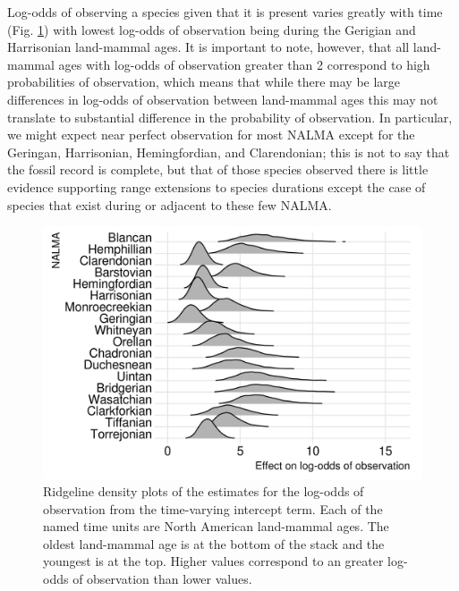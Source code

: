 \documentclass[12pt,letterpaper]{article}
\begin{document}
Log-odds of observing a species given that it is present varies greatly with time (Fig. \ref{fig:time_observe}) with lowest log-odds of observation being during the Gerigian and Harrisonian land-mammal ages. It is important to note, however, that all land-mammal ages with log-odds of observation greater than 2 correspond to high probabilities of observation, which means that while there may be large differences in log-odds of observation between land-mammal ages this may not translate to substantial difference in the probability of observation. In particular, we might expect near perfect observation for most NALMA except for the Geringan, Harrisonian, Hemingfordian, and Clarendonian; this is not to say that the fossil record is complete, but that of those species observed there is little evidence supporting range extensions to species durations except the case of species that exist during or adjacent to these few NALMA. 
\begin{figure}[ht]
  \centering
  \includegraphics[width=\textwidth,height=0.4\textheight,keepaspectratio=true]{figure/time_observation}
  \caption{Ridgeline density plots of the estimates for the log-odds of observation from the time-varying intercept term. Each of the named time units are North American land-mammal ages. The oldest land-mammal age is at the bottom of the stack and the youngest is at the top. Higher values correspond to an greater log-odds of observation than lower values.}
  \label{fig:time_observe}
\end{figure}
\end{document}

